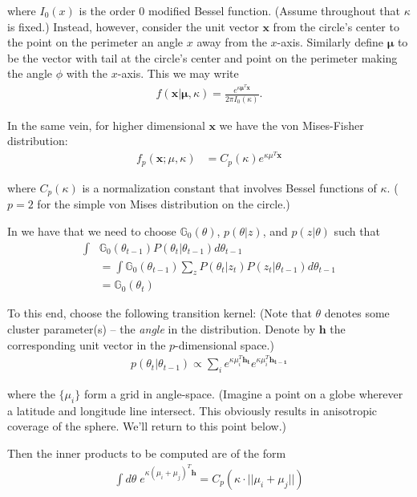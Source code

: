 \documentclass[11pt]{article}
\newcommand{\paperlink}[1]{\href{/Users/adkein/Documents/papers/#1.pdf}{\cite{#1}}}
\newcommand{\mb}{\mathbb}
\begin{document}
\noindent where $I_0(x)$ is the order 0 modified Bessel function. (Assume throughout that $\kappa$ is fixed.) Instead, however, consider the unit vector $\mathbf{x}$ from the circle's center to the point on the perimeter an angle $x$ away from the $x$-axis. Similarly define $\mathbf{\mu}$ to be the vector with tail at the circle's center and point on the perimeter making the angle $\phi$ with the $x$-axis. This we may write
%
\begin{align*}
f(\mathbf{x}|\mathbf{\mu},\kappa) = \frac{e^{\kappa \mathbf{\mu}^T \mathbf{x}}}{2\pi I_0(\kappa)}.
\end{align*}

In the same vein, for higher dimensional $\mathbf{x}$ we have the von Mises-Fisher distribution:
%
\begin{align*}
f_p(\mathbf{x};\mu,\kappa) &= C_p(\kappa) e^{\kappa \mu^T \mathbf{x}}
\end{align*}

\noindent where $C_p(\kappa)$ is a normalization constant that involves Bessel functions of $\kappa$. ($p=2$ for the simple von Mises distribution on the circle.)

In \paperlink{Neiswanger_2012} we have that we need to choose $\mb{G}_0(\theta)$, $p(\theta|z)$, and $p(z|\theta)$ such that 
%
\begin{align*}
\int &\mb{G}_0(\theta_{t-1}) P(\theta_t|\theta_{t-1})d\theta_{t-1} \\
 &= \int \mb{G}_0(\theta_{t-1}) \sum_z P(\theta_t|z_t)P(z_t|\theta_{t-1})d\theta_{t-1} \\
&= \mb{G}_0(\theta_t)
\end{align*}

\noindent To this end, choose the following transition kernel: (Note that $\theta$ denotes some cluster parameter(s) -- the {\it angle} in the distribution. Denote by $\textbf{h}$ the corresponding unit vector in the $p$-dimensional space.)
%
\begin{align*}
p(\theta_t|\theta_{t-1}) \propto \sum_i e^{\kappa \mu_i^T \mathbf{h_t}} e^{\kappa \mu_i^T \mathbf{h_{t-1}}}
\end{align*}

\noindent where the $\{\mu_i\}$ form a grid in angle-space. (Imagine a point on a globe wherever a latitude and longitude line intersect. This obviously results in anisotropic coverage of the sphere. We'll return to this point below.)

Then the inner products to be computed are of the form
%
\begin{align*}
\int d\theta \; e^{\kappa(\mu_i+\mu_j)^T\mathbf{h}} =C_p\left(\kappa\cdot||\mu_i+\mu_j||\right)
\end{align*}
\end{document}
